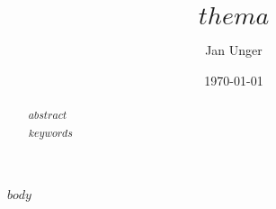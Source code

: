 \documentclass{vorlage-design-main}
\title{$thema$}
\author{Jan Unger}
\date{\today}
\begin{document}
\maketitle

\begin{abstract}
$abstract$

$keywords$
\end{abstract}

$body$


\clearpage
\printbibliography
\end{document}
